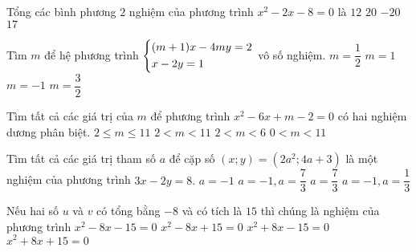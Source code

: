 \begin{ex}%
	Tổng các bình phương $2$ nghiệm của phương trình $x^2-2x-8=0$ là
	\choice
	{ $12$}
	{\True $20$}
	{$-20$}
	{$17$}
\end{ex}


\begin{ex}%
	Tìm $m$ để hệ phương trình
	$\left\{\begin{aligned}&(m + 1)x - 4my = 2\\&x - 2y = 1\end{aligned}\right.$ vô số nghiệm.
	\choice
	{ $m=\dfrac{1}{2}$ }
	{\True $m=1 $}
	{$m=-1 $}
	{$m=\dfrac{3}{2} $}
\end{ex}


\begin{ex}%
	Tìm tất cả các giá trị của $m$ để phương trình $x^2-6x+m-2=0$ có hai nghiệm dương phân biệt.
	\choice
	{ $2\leq m \leq 11$ }
	{\True $2<m<11$}
	{$2<m<6$}
	{$0<m<11$}
\end{ex}


\begin{ex}%
	Tìm tất cả các giá trị tham số $a$ để cặp số $(x;y)=(2a^2;4a+3)$ là một nghiệm của phương trình $3x-2y=8.$
	\choice
	{ $a=-1$}
	{\True $a=-1, a=\dfrac{7}{3}$}
	{$ a=\dfrac{7}{3}$}
	{$a=-1, a=\dfrac{1}{3}$}
\end{ex}


\begin{ex}%
	Nếu hai số $u$ và $v$ có tổng bằng $-8$ và có tích là $15$ thì chúng là nghiệm của phương trình
	\choice
	{ $x^2-8x-15=0$ }
	{$x^2-8x+15=0$}
	{$x^2+8x-15=0$}
	{\True $x^2+8x+15=0 $}
\end{ex}


